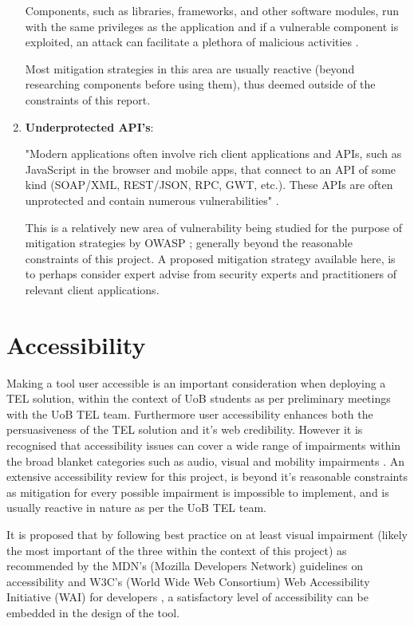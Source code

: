 \begin{enumerate}
    Components, such as libraries, frameworks, and other software modules, run with the same privileges as the application and if a vulnerable component is exploited,  an attack can facilitate  a plethora of malicious activities \cite{OWASP2017}.
    
    Most mitigation strategies in this area are usually reactive (beyond researching components before using them), thus deemed outside of the constraints of this report.
    
    \item \textbf{Underprotected API's}:
    
    "Modern applications often involve rich client applications and APIs, such as JavaScript in the browser and mobile apps, that connect to an API of some kind (SOAP/XML, REST/JSON, RPC, GWT, etc.). These APIs are often unprotected and contain numerous vulnerabilities" \cite{OWASP2017}.
    
    This is a relatively new area of vulnerability being studied for the purpose of mitigation strategies by OWASP \cite{OWASP2017}; generally beyond the reasonable constraints of this project. A proposed mitigation strategy available here, is to perhaps consider expert advise from security experts and practitioners of relevant client applications.
    
\end{enumerate}




\section{Accessibility}

Making a tool user accessible is an important consideration when deploying a TEL solution, within the context of UoB students as per preliminary meetings with the UoB TEL team. Furthermore user accessibility enhances both the persuasiveness of the TEL solution and it's web credibility. However it is recognised that accessibility issues can cover a wide range of impairments within the broad blanket categories such as audio, visual and mobility impairments \cite{Mills2015}. An extensive accessibility review for this project, is beyond it's reasonable constraints as mitigation for every possible impairment is impossible to implement, and is usually reactive in nature as per the UoB TEL team.

It is proposed that by following best practice on at least visual impairment (likely the most important of the three within the context of this project) as recommended by the MDN's (Mozilla Developers Network) guidelines \cite{Mills2015,Mills2016} on accessibility and W3C's (World Wide Web Consortium) Web Accessibility Initiative (WAI) for developers \cite{W3C}, a satisfactory level of accessibility can be embedded in the design of the tool.

